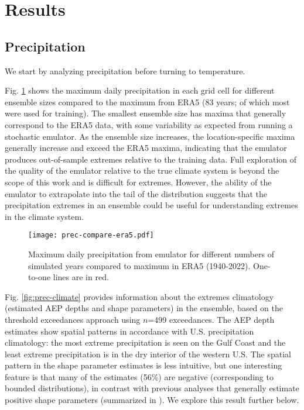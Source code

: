 \documentclass{ametsocV6.1}
\begin{document}
\section{Results}

\subsection{Precipitation}

We start by analyzing precipitation before turning to temperature.

Fig. \ref{fig:prec-maxes} shows the maximum daily precipitation in each grid cell for different ensemble sizes compared to the maximum from ERA5 (83 years; of which most were used for training). The smallest ensemble size has maxima that generally correspond to the ERA5 data, with some variability as expected from running a stochastic emulator. As the ensemble size increases, the location-specific maxima generally increase and exceed the ERA5 maxima, indicating that the emulator produces out-of-sample extremes relative to the training data. Full exploration of the quality of the emulator relative to the true climate system is beyond the scope of this work and is difficult for extremes. However, the ability of the emulator to extrapolate into the tail of the distribution suggests that the precipitation extremes in an ensemble could be useful for understanding extremes in the climate system.

\begin{figure}
    \centering
    \texttt{[image: prec-compare-era5.pdf]}
    \caption{Maximum daily precipitation from emulator for different numbers of simulated years compared to maximum in ERA5 (1940-2022). One-to-one lines are in red.}
    \label{fig:prec-maxes}
\end{figure}

Fig. \ref{fig:prec-climate} provides information about the extremes climatology (estimated AEP depths and shape parameters) in the ensemble, based on the threshold exceedances approach using $n$=499 exceedances.
The AEP depth estimates show spatial patterns in accordance with U.S. precipitation climatology: the most extreme precipitation is seen on the Gulf Coast and the least extreme precipitation is in the dry interior of the western U.S. The spatial pattern in the shape parameter estimates is less intuitive, but one interesting feature is that many of the estimates (56\%) are negative (corresponding to bounded distributions), in contrast with previous analyses that generally estimate positive shape parameters (summarized in \citet{nasem2024pmp}). %
We explore this result further below. 
\end{document}
